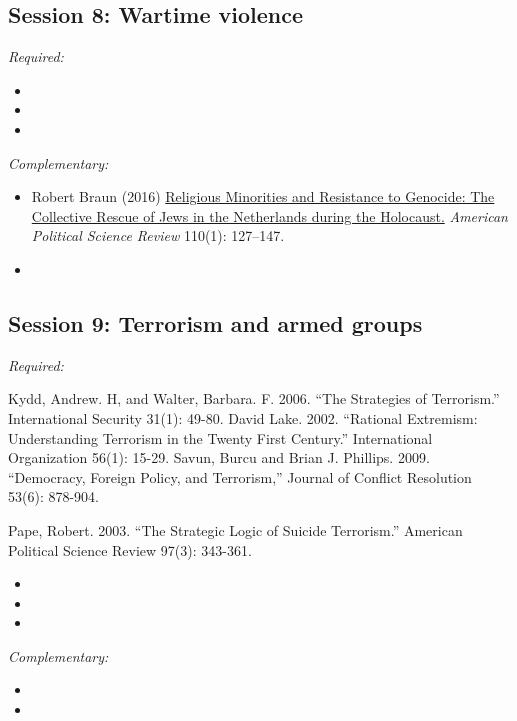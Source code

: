\documentclass[12pt, a4paper]{article}
\begin{document}
\hline
\subsection*{Session 8: Wartime violence}

\noindent\textit{Required:}

\begin{itemize}
  \item
  \item
  \item
\end{itemize}

\noindent\textit{Complementary:}

\begin{itemize}
  \item Robert Braun (2016) \href{https://doi.org/10.1017/S0003055415000544}{Religious Minorities and Resistance to Genocide: The Collective Rescue of Jews in the Netherlands during the Holocaust.} \textit{American Political Science Review} 110(1): 127--147.
  \item
\end{itemize}


\hline
\subsection*{Session 9: Terrorism and armed groups}

\noindent\textit{Required:}


Kydd, Andrew. H, and Walter, Barbara. F. 2006. “The Strategies of Terrorism.” International Security 31(1): 49-80.
David Lake. 2002. “Rational Extremism: Understanding Terrorism in the Twenty First Century.” International Organization 56(1): 15-29.
Savun, Burcu and Brian J. Phillips. 2009. “Democracy, Foreign Policy, and Terrorism,” Journal of Conflict Resolution 53(6): 878-904.


Pape, Robert. 2003. “The Strategic Logic of Suicide Terrorism.” American Political Science Review 97(3): 343-361.


\begin{itemize}
  \item
  \item
  \item
\end{itemize}

\noindent\textit{Complementary:}

\begin{itemize}
  \item
  \item
\end{itemize}
\end{document}
